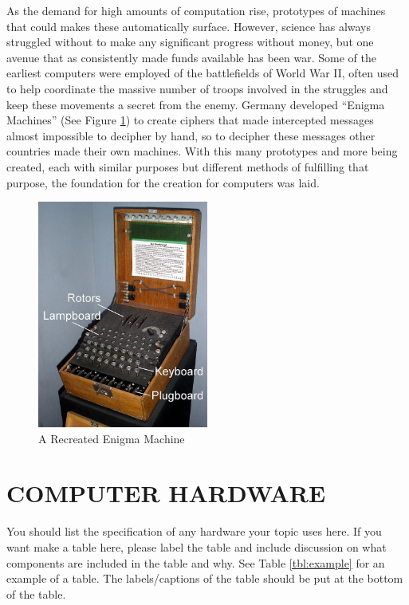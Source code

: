 \documentclass[letterpaper, 10 pt, conference]{IEEEconf}
\begin{document}
As the demand for high amounts of computation rise, 
prototypes of machines that could makes these 
automatically surface. However, science has 
always struggled without to make any significant 
progress without money, but one avenue that as 
consistently made funds available has been war. 
Some of the earliest computers were employed of the 
battlefields of World War II, often used to help coordinate 
the massive number of troops involved in the struggles and 
keep these movements a secret from the enemy. Germany developed 
“Enigma Machines” (See Figure \ref{fig:EM}) to create ciphers that made 
intercepted messages almost impossible to decipher by hand, so to decipher 
these messages other countries made their own machines. With 
this many prototypes and more being created, each with 
similar purposes but different methods of fulfilling that purpose, 
the foundation for the creation for computers was laid.  
\begin{figure}[h!]
\centering
\includegraphics[width=0.5\textwidth]{EnigmaMachineLabeled}
\caption{A Recreated Enigma Machine}
\label{fig:EM}
\end{figure}   

\section{COMPUTER HARDWARE}

You should list the specification of any hardware your topic
uses here. If you want make a table here, please label the table
and include discussion on what components are included in the
table and why. See Table
\ref{tbl:example} for an example of a table.
The labels/captions of the table should be put at the bottom
of the table.
\end{document}
